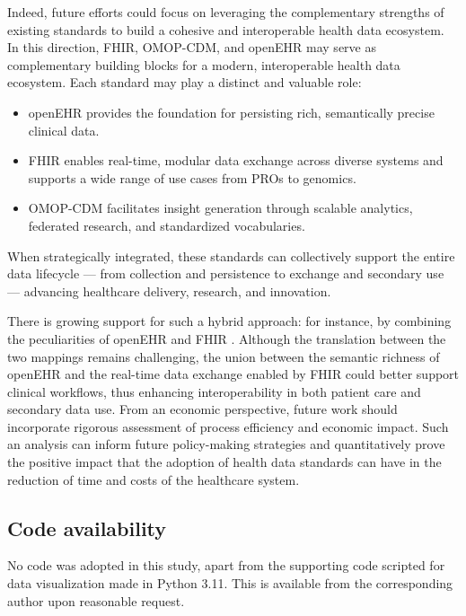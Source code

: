 Indeed, future efforts could focus on leveraging the complementary strengths of existing standards to build a cohesive and interoperable health data ecosystem. In this direction, FHIR, OMOP-CDM, and openEHR may serve as complementary building blocks for a modern, interoperable health data ecosystem. Each standard may play a distinct and valuable role:

\begin{itemize}
  \item openEHR provides the foundation for persisting rich, semantically precise clinical data.
  \item FHIR enables real-time, modular data exchange across diverse systems and supports a wide range of use cases from PROs to genomics.
  \item OMOP-CDM facilitates insight generation through scalable analytics, federated research, and standardized vocabularies.
\end{itemize}

When strategically integrated, these standards can collectively support the entire data lifecycle --- from collection and persistence to exchange and secondary use --- advancing healthcare delivery, research, and innovation.

There is growing support for such a hybrid approach: for instance, by combining the peculiarities of openEHR and FHIR \cite{smolik_comparison_2023}. Although the translation between the two mappings remains challenging, the union between the semantic richness of openEHR and the real-time data exchange enabled by FHIR could better support clinical workflows, thus enhancing interoperability in both patient care and secondary data use. From an economic perspective, future work should incorporate rigorous assessment of process efficiency and economic impact. Such an analysis can inform future policy-making strategies and quantitatively prove the positive impact that the adoption of health data standards can have in the reduction of time and costs of the healthcare system.

\subsection{Code availability}
\label{sec:paper1_code_availability}

No code was adopted in this study, apart from the supporting code scripted for data visualization made in Python 3.11. This is available from the corresponding author upon reasonable request.

